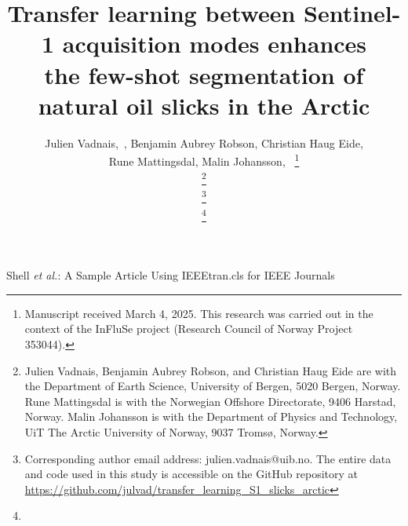 \documentclass[lettersize,journal]{IEEEtran}
\begin{document}
\title{Transfer learning between Sentinel-1 acquisition modes enhances \\ the few-shot segmentation of natural oil slicks in the Arctic}

\author{
    Julien Vadnais,~, 
    Benjamin Aubrey Robson, 
    Christian Haug Eide, \\
    Rune Mattingsdal, 
    Malin Johansson,~ 
\thanks{Manuscript received March 4, 2025. This research was carried out in the context of the InFluSe project (Research Council of Norway Project 353044).}

\thanks{Julien Vadnais, Benjamin Aubrey Robson, and Christian Haug Eide are with the Department of Earth Science, University of Bergen, 5020 Bergen, Norway.
Rune Mattingsdal is with the Norwegian Offshore Directorate, 9406 Harstad, Norway.
Malin Johansson is with the Department of Physics and Technology, UiT The Arctic University of Norway, 9037 Tromsø, Norway.} 

\thanks{Corresponding author email address: julien.vadnais@uib.no. The entire data and code used in this study is accessible on the GitHub repository at \\ 
\url{https://github.com/julvad/transfer_learning_S1_slicks_arctic}}
 
\thanks{}%
}

%
{Shell \MakeLowercase{\textit{et al.}}: A Sample Article Using IEEEtran.cls for IEEE Journals}


\maketitle
\end{document}
